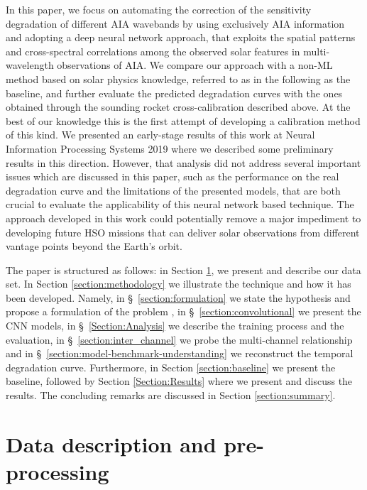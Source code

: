 \documentclass{aa}
\begin{document}
In this paper, we focus on automating the correction of the sensitivity degradation of different AIA wavebands by using exclusively AIA information and adopting a deep neural network \citep[DNN, ][]{goodfellow2016deep} approach, that exploits the spatial patterns and cross-spectral correlations among the observed solar features in multi-wavelength observations of AIA. We compare our approach with a non-ML method based on solar physics knowledge, referred to as in the following as the baseline, and further evaluate the predicted degradation curves with the ones obtained through the sounding rocket cross-calibration described above. At the best of our knowledge this is the first attempt of developing a calibration method of this kind.  We presented an early-stage results of this work at Neural Information Processing Systems 2019 \citep[NeurIPS 2019, ][]{neuberg2019} where we described some preliminary results in this direction. However, that analysis did not address several important issues which are discussed in this paper, such as the performance on the real degradation curve and the limitations of the presented models, that are both crucial to evaluate the applicability of this neural network based technique. The approach developed in this work could potentially remove a major impediment to developing future HSO missions that can deliver solar observations from different vantage points beyond the Earth's orbit.
 
The paper is structured as follows: in Section \ref{Section:data}, we present and describe our data set. In Section \ref{section:methodology} we illustrate the technique and how it has been developed. Namely, in \S~\ref{section:formulation} we state the hypothesis and propose a formulation of the problem , in \S~\ref{section:convolutional} we present the CNN models, in \S~\ref{Section:Analysis} we describe the training process and the evaluation, in \S~\ref{section:inter_channel} we probe the multi-channel relationship and in  \S~\ref{section:model-benchmark-understanding} we reconstruct the temporal degradation curve. Furthermore, in Section \ref{section:baseline} we present the baseline, followed by Section \ref{Section:Results} where we present and discuss the results. The concluding remarks are discussed in Section \ref{section:summary}.
 
\section{Data description and pre-processing}
\label{Section:data}
\end{document}

